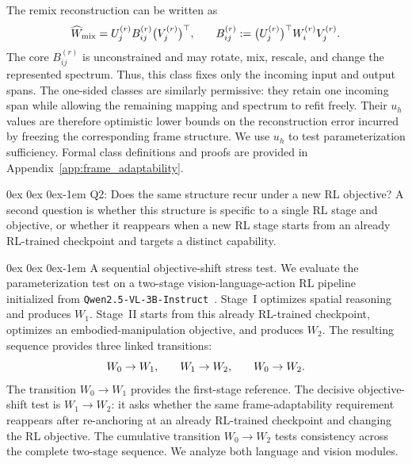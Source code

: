 \documentclass[11pt, a4paper]{utda}
\makeatletter
\renewcommand{\paragraph}{%
  \@startsection{paragraph}{4}%
  {\z@}{0ex \@plus 0ex \@minus 0ex}{-1em}%
  {\normalfont\normalsize\bfseries}%
}
\theoremstyle{plain}
\theoremstyle{definition}
\theoremstyle{remark}
\makeatother
\begin{document}
The remix reconstruction can be written as
\begin{equation}
\label{eq:incoming_subspace_remix}
\small
    \widehat W_{\mathrm{mix}}
    =
    U_j^{(r)}
    B_{ij}^{(r)}
    \bigl(V_j^{(r)}\bigr)^\top,
    \qquad
    B_{ij}^{(r)}
    :=
    \bigl(U_j^{(r)}\bigr)^\top
    W_i^{(r)}
    V_j^{(r)}.
\end{equation}
The core $B_{ij}^{(r)}$ is unconstrained and may rotate, mix, rescale, and
change the represented spectrum. Thus, this class fixes only the incoming input
and output spans. The one-sided classes are similarly permissive: they retain
one incoming span while allowing the remaining mapping and spectrum to refit
freely. Their $u_h$ values are therefore optimistic lower bounds on the
reconstruction error incurred by freezing the corresponding frame structure.
We use $u_h$ to test parameterization sufficiency. Formal class definitions and
proofs are provided in Appendix~\ref{app:frame_adaptability}.


\paragraph{Q2: Does the same structure recur under a new RL objective?}
A second question is whether this structure is specific to a single RL stage
and objective, or whether it reappears when a new RL stage starts from an
already RL-trained checkpoint and targets a distinct capability.



\paragraph{A sequential objective-shift stress test.}
We evaluate the parameterization test on a two-stage vision-language-action RL
pipeline initialized from
\texttt{Qwen2.5-VL-3B-Instruct}~\cite{yuan2025embodied}.
Stage~I optimizes spatial reasoning and produces $W_1$.
Stage~II starts from this already RL-trained checkpoint, optimizes an
embodied-manipulation objective, and produces $W_2$.
The resulting sequence provides three linked transitions:
\begin{equation}
\label{eq:vla_transitions}
\small
    W_0\rightarrow W_1,
    \qquad
    W_1\rightarrow W_2,
    \qquad
    W_0\rightarrow W_2.
\end{equation}
The transition $W_0\rightarrow W_1$ provides the first-stage reference.
The decisive objective-shift test is $W_1\rightarrow W_2$: it asks whether the
same frame-adaptability requirement reappears after re-anchoring at an already
RL-trained checkpoint and changing the RL objective.
The cumulative transition $W_0\rightarrow W_2$ tests consistency across the
complete two-stage sequence. We analyze both language and vision modules.
\end{document}
